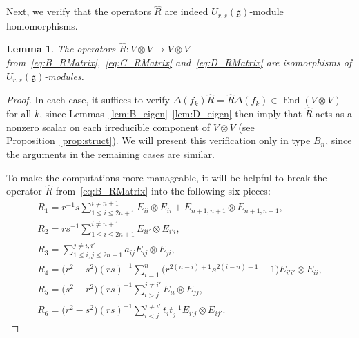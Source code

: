 \documentclass[10pt,a4paper]{amsart}
\numberwithin{equation}{section}
\newtheorem{Lemma}[Theorem]{Lemma}
\DeclareMathOperator{\End}{End}
\newcommand{\fg}{\mathfrak{g}}
\newcommand{\uu}{U_{r,s}(\fg)}
\begin{document}
Next, we verify that the operators $\hat{R}$ are indeed $\uu$-module homomorphisms.


\begin{Lemma}\label{lem:B_Intertwining}
The operators $\hat{R}\colon V \otimes V \to V \otimes V$ from~\eqref{eq:B_RMatrix},~\eqref{eq:C_RMatrix} and~\eqref{eq:D_RMatrix} are isomorphisms of $\uu$-modules.
\end{Lemma}


\begin{proof}
In each case, it suffices to verify $\Delta(f_{k})\hat{R} = \hat{R}\Delta(f_{k})\in \End(V \otimes V)$ for all $k$, since Lemmas~\ref{lem:B_eigen}--\ref{lem:D_eigen} then imply that $\hat{R}$ acts as a nonzero scalar on each irreducible component of $V \otimes V$ (see Proposition~\ref{prop:struct}). We will present this verification only in type $B_{n}$, since the arguments in the remaining cases are similar.

To make the computations more manageable, it will be helpful to break the operator $\hat{R}$ from~\eqref{eq:B_RMatrix} into the following six pieces:
\begin{gather*}
 R_{1} = r^{-1}s \sum_{1\leq i\leq 2n+1}^{i \neq n + 1} E_{ii} \otimes E_{ii}
 + E_{n + 1,n + 1} \otimes E_{n + 1,n+1}, \\
 R_{2} = rs^{-1} \sum_{1\leq i\leq 2n+1}^{i \neq n + 1} E_{ii'} \otimes E_{i'i}, \\
 R_{3} = \sum_{1\leq i,j\leq 2n+1}^{j \neq i,i'} a_{ij}E_{ij} \otimes E_{ji}, \\
 R_{4} = \bigl(r^{2} - s^{2}\bigr)(rs)^{-1} \sum_{i = 1}^{n}\bigl(r^{2(n - i) + 1}s^{2(i - n) - 1} - 1\bigr) E_{i'i'} \otimes E_{ii}, \\
 R_{5} = \bigl(s^{2} - r^{2}\bigr)(rs)^{-1} \sum_{i > j}^{j \neq i'} E_{ii} \otimes E_{jj},\\
 R_{6} = \bigl(r^{2} - s^{2}\bigr)(rs)^{-1} \sum_{i < j}^{j \neq i'} t_{i}t_{j}^{-1}E_{i'j} \otimes E_{ij'}.
\end{gather*}



\end{proof}
\end{document}
